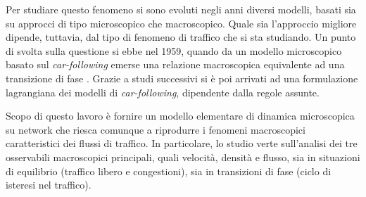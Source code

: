 \documentclass[../main.tex]{subfiles}
\begin{document}
Per studiare questo fenomeno si sono evoluti negli anni diversi modelli, basati sia su approcci di tipo microscopico che macroscopico.
Quale sia l'approccio migliore dipende, tuttavia, dal tipo di fenomeno di traffico che si sta studiando.
Un punto di svolta sulla questione si ebbe nel 1959, quando da un modello microscopico basato sul \emph{car-following} emerse una relazione macroscopica equivalente ad una transizione di fase \cite{gazis2002origins}.
Grazie a studi successivi si \`e poi arrivati ad una formulazione lagrangiana dei modelli di \emph{car-following}, dipendente dalla regole assunte.

Scopo di questo lavoro \`e fornire un modello elementare di dinamica microscopica su network che riesca comunque a riprodurre i fenomeni macroscopici caratteristici dei flussi di traffico.
In particolare, lo studio verte sull'analisi dei tre osservabili macroscopici principali, quali velocit\`a, densit\`a e flusso, sia in situazioni di equilibrio (traffico libero e congestioni), sia in transizioni di fase (ciclo di isteresi nel traffico).
\end{document}
